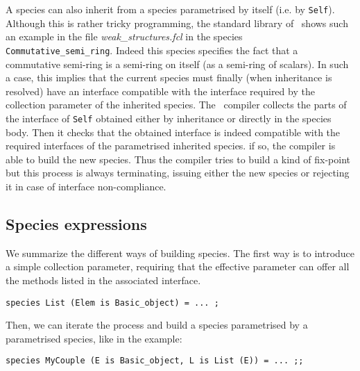 A species can also inherit from a species parametrised by itself
(i.e. by {\tt Self}). Although this is rather tricky programming, the
standard library of \focal\ shows such an example in the file {\em
  weak\_structures.fcl} in the species {\tt
  Commutative\_semi\_ring}. Indeed this species specifies the fact
that a commutative semi-ring is a semi-ring on itself (as a semi-ring
of scalars).  In such a case, this implies that the current species
must finally (when inheritance is resolved) have an interface
compatible with the interface required by the collection parameter of
the inherited species. The \focal\ compiler collects the parts of the
interface of {\tt Self} obtained either by inheritance or directly in
the species body. Then it checks that the obtained interface is indeed
compatible with the required interfaces of the parametrised inherited
species. if so, the compiler is able to build the new species. Thus
the compiler tries to build a kind of fix-point but  this process is
always terminating, issuing either the new species or rejecting it in
case of interface non-compliance. 




\subsection{Species expressions}
We summarize the different ways of building species. The first way is
to introduce a simple collection parameter, requiring that the
effective parameter can offer all the methods listed in the associated
interface. 

{\scriptsize
\begin{lstlisting}
species List (Elem is Basic_object) = ... ;
\end{lstlisting}
}

Then, we can iterate the process and build 
a species parametrised by a parametrised species, like in the example:
{\scriptsize
\begin{lstlisting}
species MyCouple (E is Basic_object, L is List (E)) = ... ;;
\end{lstlisting}
}

